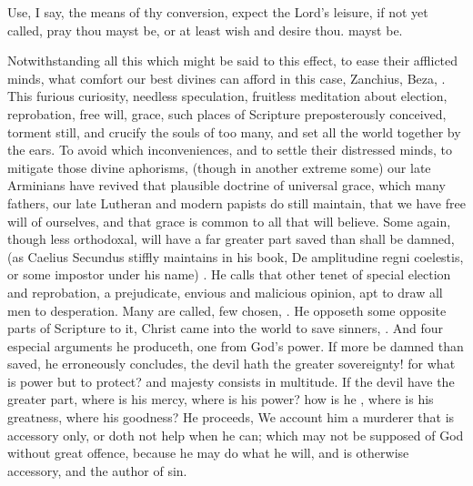 {Use, I say, the means of thy conversion, expect the Lord's leisure, if
not yet called, pray thou mayst be, or at least wish and desire thou.
mayst be.

Notwithstanding all this which might be said to this effect, to ease
their afflicted minds, what comfort our best divines can afford in this
case, Zanchius, Beza, \etc{}. This furious curiosity, needless speculation,
fruitless meditation about election, reprobation, free will, grace,
such places of Scripture preposterously conceived, torment still, and
crucify the souls of too many, and set all the world together by the
ears. To avoid which inconveniences, and to settle their distressed
minds, to mitigate those divine aphorisms, (though in another extreme
some) our late Arminians have revived that plausible doctrine of
universal grace, which many fathers, our late Lutheran and modern
papists do still maintain, that we have free will of ourselves, and
that grace is common to all that will believe. Some again, though less
orthodoxal, will have a far greater part saved than shall be damned,
(as Caelius Secundus stiffly maintains in his book, \textlatin{De
amplitudine regni coelestis}, or some impostor under his name) . He calls that other tenet of
special election and reprobation, a prejudicate, envious and
malicious opinion, apt to draw all men to desperation. Many are called,
few chosen, \etc{}. He opposeth some opposite parts of Scripture to it,
Christ came into the world to save sinners, \etc{}. And four especial
arguments he produceth, one from God's power. If more be damned than
saved, he erroneously concludes, the devil hath the greater
sovereignty! for what is power but to protect? and majesty consists in
multitude. If the devil have the greater part, where is his mercy,
where is his power? how is he  \etc{},
where is his greatness, where his goodness? He proceeds, We
account him a murderer that is accessory only, or doth not help when he
can; which may not be supposed of God without great offence, because he
may do what he will, and is otherwise accessory, and the author of sin.

}
